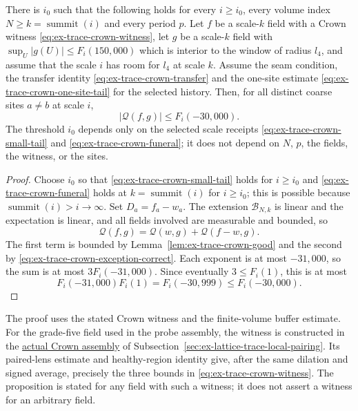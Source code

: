\begin{proposition}
\label{prop:ex-trace-crown-buffer}
There is $i_0$ such that the following holds for every $i\ge i_0$, every
volume index $N\ge k=\operatorname{summit}(i)$ and every period $p$.
Let $f$ be a scale-$k$ field with a Crown witness
\eqref{eq:ex-trace-crown-witness}, let $g$ be a scale-$k$ field with
$\sup_U|g(U)|\le F_i(150{,}000)$ which is interior to the window of radius
$l_4$, and assume that the scale $i$ has room for $l_4$ at scale $k$.
Assume the seam condition, the transfer identity
\eqref{eq:ex-trace-crown-transfer} and the one-site estimate
\eqref{eq:ex-trace-crown-one-site-tail} for the selected history. Then, for
all distinct coarse sites $a\ne b$ at scale $i$,
\[
 |\mathcal Q(f,g)|\le F_i(-30{,}000).
\]
The threshold $i_0$ depends only on the selected scale receipts
\eqref{eq:ex-trace-crown-small-tail} and \eqref{eq:ex-trace-crown-funeral};
it does not depend on $N$, $p$, the fields, the witness, or the sites.
\end{proposition}
\begin{proof}
Choose $i_0$ so that \eqref{eq:ex-trace-crown-small-tail} holds for
$i\ge i_0$ and \eqref{eq:ex-trace-crown-funeral} holds at
$k=\operatorname{summit}(i)$ for $i\ge i_0$; this is possible because
$\operatorname{summit}(i)>i\to\infty$. Set $D_a=f_a-w_a$. The extension
$\mathcal B_{N,k}$ is linear and the expectation is linear, and all fields
involved are measurable and bounded, so
\[
 \mathcal Q(f,g)=\mathcal Q(w,g)+\mathcal Q(f-w,g).
\]
The first term is bounded by Lemma~\ref{lem:ex-trace-crown-good} and the
second by \eqref{eq:ex-trace-crown-exception-correct}. Each exponent is at
most $-31{,}000$, so the sum is at most $3F_i(-31{,}000)$. Since eventually
$3\le F_i(1)$, this is at most
\[F_i(-31{,}000)F_i(1)=F_i(-30{,}999)\le F_i(-30{,}000).\]
\end{proof}

The proof uses the stated Crown witness and the finite-volume buffer
estimate. For the grade-five field used in the probe assembly, the witness is
constructed in the \hyperref[par:trace-actual-crown]{actual Crown assembly}
of Subsection~\ref{sec:ex-lattice-trace-local-pairing}. Its paired-lens
estimate and healthy-region identity give, after the same dilation and
signed average, precisely the three bounds in
\eqref{eq:ex-trace-crown-witness}. The proposition is stated for any
field with such a witness; it does not assert a witness for an arbitrary
field.
